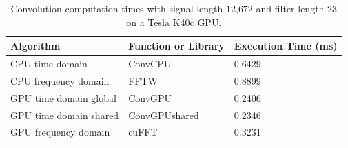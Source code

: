 \begin{table}
\captionsetup{width=6in}
\caption{Convolution computation times with signal length $12$,$672$ and filter length $23$ on a Tesla K40c GPU.}
\begin{center}
\begin{tabular}{lll}
	\toprule
	Algorithm 				& Function or Library		& Execution Time (ms) \\ \midrule
	CPU time domain 		& ConvCPU 					& 0.6429		\\
	CPU frequency domain 	& FFTW 						& 0.8899		\\
	GPU time domain global 	& ConvGPU 					& 0.2406		\\
	GPU time domain shared 	& ConvGPUshared 			& 0.2346		\\
	GPU frequency domain 	& cuFFT						& 0.3231		\\
	\bottomrule
\end{tabular}
\end{center}
\label{tab:CPUvsGPUtable_12672_23}
\end{table}

